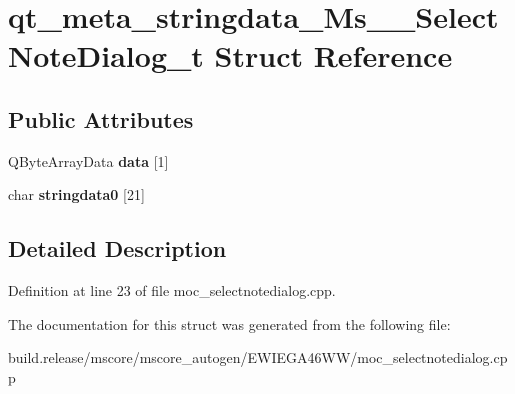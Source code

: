 \hypertarget{structqt__meta__stringdata___ms_____select_note_dialog__t}{}\section{qt\+\_\+meta\+\_\+stringdata\+\_\+\+Ms\+\_\+\+\_\+\+Select\+Note\+Dialog\+\_\+t Struct Reference}
\label{structqt__meta__stringdata___ms_____select_note_dialog__t}
\subsection*{Public Attributes}
\begin{DoxyCompactItemize}
\item 
\mbox{\label{structqt__meta__stringdata___ms_____select_note_dialog__t_a8013298bbc3072d3419bc2879c2be185}} 
Q\+Byte\+Array\+Data {\bfseries data} \mbox{[}1\mbox{]}
\item 
\mbox{\label{structqt__meta__stringdata___ms_____select_note_dialog__t_aff299835f891e296e543116b2b532470}} 
char {\bfseries stringdata0} \mbox{[}21\mbox{]}
\end{DoxyCompactItemize}


\subsection{Detailed Description}


Definition at line 23 of file moc\+\_\+selectnotedialog.\+cpp.



The documentation for this struct was generated from the following file\+:\begin{DoxyCompactItemize}
\item 
build.\+release/mscore/mscore\+\_\+autogen/\+E\+W\+I\+E\+G\+A46\+W\+W/moc\+\_\+selectnotedialog.\+cpp\end{DoxyCompactItemize}
